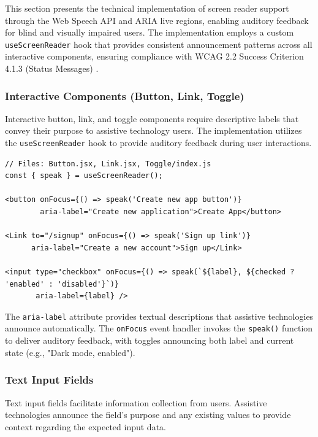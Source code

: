 
This section presents the technical implementation of screen reader support through the Web Speech API and ARIA live regions, enabling auditory feedback for blind and visually impaired users. The implementation employs a custom \texttt{useScreenReader} hook that provides consistent announcement patterns across all interactive components, ensuring compliance with WCAG 2.2 Success Criterion 4.1.3 (Status Messages) \cite{WCAG22}.

\subsubsection{Interactive Components (Button, Link, Toggle)}

Interactive button, link, and toggle components require descriptive labels that convey their purpose to assistive technology users. The implementation utilizes the \texttt{useScreenReader} hook to provide auditory feedback during user interactions.

\begin{lstlisting}[caption={Interactive components with screen reader support}, label={lst:interactive-sr}]
// Files: Button.jsx, Link.jsx, Toggle/index.js
const { speak } = useScreenReader();

<button onFocus={() => speak('Create new app button')} 
        aria-label="Create new application">Create App</button>

<Link to="/signup" onFocus={() => speak('Sign up link')} 
      aria-label="Create a new account">Sign up</Link>

<input type="checkbox" onFocus={() => speak(`${label}, ${checked ? 'enabled' : 'disabled'}`)} 
       aria-label={label} />
\end{lstlisting}

The \texttt{aria-label} attribute provides textual descriptions that assistive technologies announce automatically. The \texttt{onFocus} event handler invokes the \texttt{speak()} function to deliver auditory feedback, with toggles announcing both label and current state (e.g., "Dark mode, enabled").

\subsubsection{Text Input Fields}

Text input fields facilitate information collection from users. Assistive technologies announce the field's purpose and any existing values to provide context regarding the expected input data.

